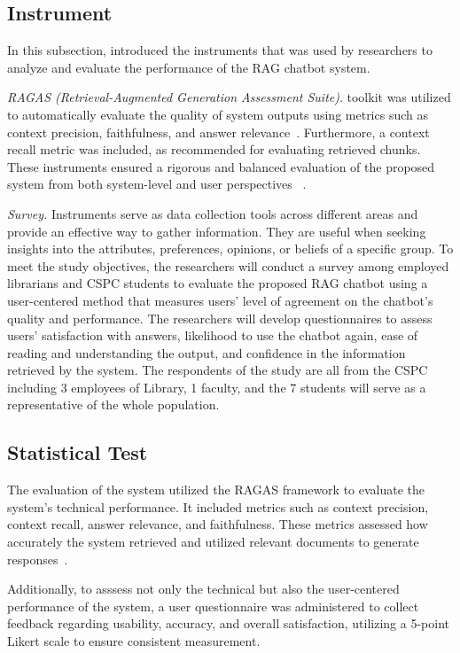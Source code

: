 \begin{refsection}
\subsection{Instrument}

In this subsection, introduced the instruments that was used by researchers to analyze and evaluate the performance of the RAG chatbot system.

\textit{RAGAS (Retrieval-Augmented Generation Assessment Suite)}. toolkit was utilized to automatically evaluate the quality of system outputs using metrics such as context precision, faithfulness, and answer relevance~\cite{shinn2023ragas}. Furthermore, a context recall metric was included, as recommended for evaluating retrieved chunks. These instruments ensured a rigorous and balanced evaluation of the proposed system from both system-level and user perspectives~ \cite{lin2021bert}.

\textit{Survey.} Instruments serve as data collection tools across different areas and provide an effective way to gather information. They are useful when seeking insights into the attributes, preferences, opinions, or beliefs of a specific group. To meet the study objectives, the researchers will conduct a survey among employed librarians and CSPC students to evaluate the proposed RAG chatbot using a user-centered method that measures users’ level of agreement on the chatbot’s quality and performance. The researchers will develop questionnaires to assess users’ satisfaction with answers, likelihood to use the chatbot again, ease of reading and understanding the output, and confidence in the information retrieved by the system. The respondents of the study are all from the CSPC including 3 employees of Library, 1 faculty, and the 7 students will serve as a representative of the whole population.


\subsection{Statistical Test}

The evaluation of the system utilized the RAGAS framework to evaluate the system's technical performance. It included metrics such as context precision, context recall, answer relevance, and faithfulness. These metrics assessed how accurately the system retrieved and utilized relevant documents to generate responses~\cite{holmes2023chatbot, ameli2024ranking, lin2024satisfaction}.

Additionally, to asssess not only the technical but also the user-centered performance of the system, a user questionnaire was administered to collect feedback regarding usability, accuracy, and overall satisfaction, utilizing a 5-point Likert scale to ensure consistent measurement.


\end{refsection}
